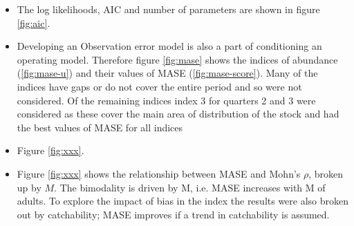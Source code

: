 \begin{itemize}
   \item The log likelihoods, AIC and number of parameters are shown in figure \ref{fig:aic}.
   
   \item Developing an Observation error model is also a part of conditioning an operating model. Therefore figure \ref{fig:mase} shows the indices of abundance (\ref{fig:mase-u}) and their values of MASE (\ref{fig:mase-score}). Many of the indices have gaps or do not cover the entire period and so were not considered. Of the remaining indices index 3 for quarters 2 and 3 were considered as these cover the main area of distribution of the stock and had the best values of MASE for all indices \item Figure \ref{fig:xxx}.
   
   \item Figure \ref{fig:xxx} shows the relationship between MASE and Mohn's $\rho$, broken up by $M$. The bimodality is driven by M, i.e. MASE increases with M of adults. To explore the impact of bias in the index the results were also broken out by catchability; MASE  improves if a trend in catchability is assumed. 
   


\end{itemize}


